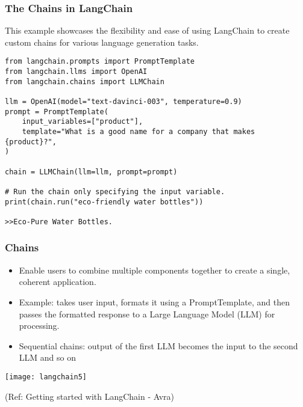 \begin{frame}[fragile]
\frametitle{The Chains in LangChain}

This example showcases the flexibility and ease of using LangChain to create custom chains for various language generation tasks.

\begin{lstlisting}
from langchain.prompts import PromptTemplate
from langchain.llms import OpenAI
from langchain.chains import LLMChain

llm = OpenAI(model="text-davinci-003", temperature=0.9)
prompt = PromptTemplate(
    input_variables=["product"],
    template="What is a good name for a company that makes {product}?",
)

chain = LLMChain(llm=llm, prompt=prompt)

# Run the chain only specifying the input variable.
print(chain.run("eco-friendly water bottles"))

>>Eco-Pure Water Bottles.
\end{lstlisting}	  

\end{frame}



\begin{frame}\frametitle{Chains}

\begin{itemize}
\item Enable users to combine multiple components together to create a single, coherent application.
\item Example: takes user input, formats it using a PromptTemplate, and then passes the formatted response to a Large Language Model (LLM) for processing.
\item Sequential chains: output of the first LLM becomes the input to the second LLM and so on
\end{itemize}

\begin{center}
\texttt{[image: langchain5]}
\end{center}	  


{\tiny (Ref: Getting started with LangChain - Avra)}
\end{frame}


